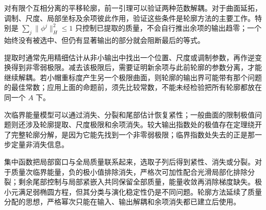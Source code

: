 对有限个互相分离的平移轮廓，前一引理可以验证两种范数解耦。对于曲面延拓，调制、尺度、局部坐标及余项彼此作用，验证这些条件是轮廓方法的主要工作。特别是 \(\sum_j\|\phi^j\|_H^2\le1\) 只控制已提取的质量，不会自行推出余项的输出趋零；一个始终没有被选中、但仍有显著输出的部分就会阻断最后的等式。

\ProseParagraphBreak

提取时通常先用精细估计从非小输出中找出一个位置、尺度或调制参数，再作逆变换得到非零弱极限。减去该极限后，需要证明新余项与此前轮廓的参数分离，才能继续解耦。若小帽重标度产生另一个极限曲面，则轮廓的输出界可能带有那个问题的最佳常数；应用上面的命题前，须先比较常数，不能未经检验把所有轮廓都放在同一个 \(A\) 下。

\ProseParagraphBreak

次临界能量模型可以通过消失、分裂和尾部估计恢复紧性；一般曲面的限制极值问题则还涉及轮廓提取、尺度极限和余项消失。较大输出指数处的极值存在定理绕开了完整轮廓分解，是因为它能先找到一个非零弱极限；临界指数处失去的正是那一步定量非消失信息。

\begin{chaptersummary}
集中函数把局部窗口与全局质量联系起来，选取子列后得到紧性、消失或分裂。对于质量次临界能量，负的极小值排除消失，严格次可加性配合光滑局部化排除分裂；剩余尾部控制与局部紧嵌入共同保留全部质量，能量收敛再消除梯度缺失。极小元满足弱椭圆方程，但其分类与演化稳定性仍是不同问题。轮廓方法延续了质量分配的思想，严格幂次只能在输入、输出解耦和余项消失都已建立后使用。
\end{chaptersummary}

\BookExercises

